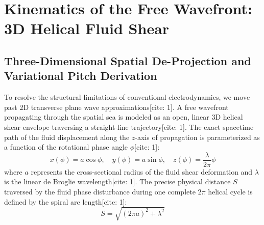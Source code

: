 \documentclass[11pt,a4paper]{article}
\begin{document}
	\section{Kinematics of the Free Wavefront: 3D Helical Fluid Shear}
	
	\subsection{Three-Dimensional Spatial De-Projection and Variational Pitch Derivation}
	To resolve the structural limitations of conventional electrodynamics, we move past 2D transverse plane wave approximations[cite: 1]. A free wavefront propagating through the spatial sea is modeled as an open, linear 3D helical shear envelope traversing a straight-line trajectory[cite: 1]. The exact spacetime path of the fluid displacement along the $z$-axis of propagation is parameterized as a function of the rotational phase angle $\phi$[cite: 1]:
	\begin{equation}
		x(\phi) = a \cos\phi, \quad y(\phi) = a \sin\phi, \quad z(\phi) = \frac{\lambda}{2\pi} \phi
	\end{equation}
	where $a$ represents the cross-sectional radius of the fluid shear deformation and $\lambda$ is the linear de Broglie wavelength[cite: 1]. The precise physical distance $S$ traversed by the fluid phase disturbance during one complete $2\pi$ helical cycle is defined by the spiral arc length[cite: 1]:
	\begin{equation}
		S = \sqrt{(2\pi a)^2 + \lambda^2}
	\end{equation}
	
\end{document}
